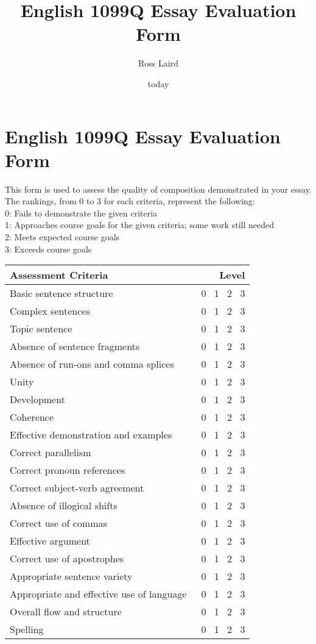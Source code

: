 \documentclass[letterpaper,10pt,DIV=9,headsepline]{scrreprt}
\author{Ross Laird}
\title{English 1099Q Essay Evaluation Form}
\date{today}
\begin{document}
\pagestyle{scrheadings}
\setcounter{secnumdepth}{-1}

\section{English 1099Q Essay Evaluation Form}

This form is used to assess the quality of composition demonstrated in
your essay. \\
The rankings, from 0 to 3 for each criteria, represent the following:\\
0: Fails to demonstrate the given criteria\\
1: Approaches course goals for the given criteria; some work still needed\\
2: Meets expected course goals\\
3: Exceeds course goals\\

\begin{tabular}{|l|r|}
\hline
Assessment Criteria & Level\\
\hline
Basic sentence structure & \ 0 \ 1 \ 2 \ 3 \\
Complex sentences & \ 0  \ 1 \ 2 \ 3 \\
Topic sentence & \ 0  \ 1 \ 2 \ 3 \\
Absence of sentence fragments & \ 0  \ 1 \ 2 \ 3 \\
Absence of run-ons and comma splices & \ 0  \ 1 \ 2 \ 3 \\
Unity & \ 0  \ 1 \ 2 \ 3 \\
Development & \ 0  \ 1 \ 2 \ 3 \\
Coherence & \ 0  \ 1 \ 2 \ 3 \\
Effective demonstration and examples & \ 0  \ 1 \ 2 \ 3 \\
Correct parallelism & \ 0  \ 1 \ 2 \ 3 \\
Correct pronoun references & \ 0  \ 1 \ 2 \ 3 \\
Correct subject-verb agreement & \ 0  \ 1 \ 2 \ 3 \\
Absence of illogical shifts & \ 0  \ 1 \ 2 \ 3 \\
Correct use of commas & \ 0  \ 1 \ 2 \ 3 \\
Effective argument &  \ 0 \ 1 \ 2 \ 3 \\
Correct use of apostrophes & \ 0  \ 1 \ 2 \ 3 \\
Appropriate sentence variety & \ 0  \ 1 \ 2 \ 3 \\
Appropriate and effective use of language & \ 0  \ 1 \ 2 \ 3 \\
Overall flow and structure & \ 0  \ 1 \ 2 \ 3 \\
Spelling & \ 0  \ 1 \ 2 \ 3 \\
\hline
\end{tabular}
\end{document}
